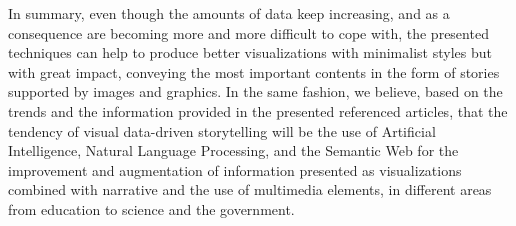 \documentclass[runningheads]{llncs}
\begin{document}
In summary, even though the amounts of data keep increasing, and as a consequence are becoming more and more difficult to cope with, the presented techniques can help to produce better visualizations with minimalist styles but with great impact, conveying the most important contents in the form of stories supported by images and graphics. In the same fashion, we believe, based on the trends and the information provided in the presented referenced articles, that the tendency of visual data-driven storytelling will be the use of Artificial Intelligence, Natural Language Processing, and the Semantic Web for the improvement and augmentation of information presented as visualizations combined with narrative and the use of multimedia elements, in different areas from education to science and the government.

%
%
%


%
\end{document}
